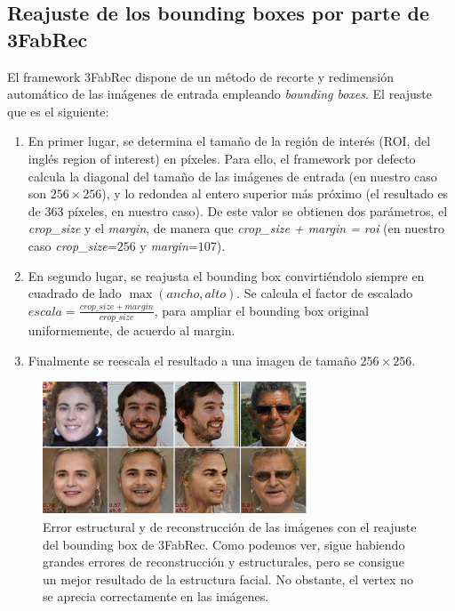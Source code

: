         \subsection{Reajuste de los bounding boxes por parte de 3FabRec}
            \noindent El framework 3FabRec dispone de un método de recorte y redimensión automático de las imágenes de entrada empleando \textit{bounding boxes}. El reajuste que es el siguiente:
            \begin{enumerate}
                \item En primer lugar, se determina el tamaño de la región de interés (ROI, del inglés region of interest) en píxeles. Para ello, el framework por defecto calcula la diagonal del tamaño de las imágenes de entrada (en nuestro caso son $256 \times 256$), y lo redondea al entero superior más próximo (el resultado es de $363$ píxeles, en nuestro caso). De este valor se obtienen dos parámetros, el \textit{crop\_size} y el \textit{margin}, de manera que \textit{crop\_size + margin = roi} (en nuestro caso \textit{crop\_size}=$256$ y \textit{margin}=$107$).
                \item En segundo lugar, se reajusta el bounding box convirtiéndolo siempre en cuadrado de lado $\max(ancho,alto)$. Se calcula el factor de escalado $escala = \frac{crop\_size + margin}{crop\_size}$, para ampliar el bounding box original uniformemente, de acuerdo al margin. 
                \item  Finalmente se reescala el resultado a una imagen de tamaño $256\times 256$.
            \end{enumerate}

            \begin{figure}[!h]
                \centering
                \includegraphics[width=0.7\textwidth]{img/bounding_box_3fabrec.png}
                \caption{Error estructural y de reconstrucción de las imágenes con el reajuste del bounding box de 3FabRec. Como podemos ver, sigue habiendo grandes errores de reconstrucción y estructurales, pero se consigue un mejor resultado de la estructura facial. No obstante, el vertex no se aprecia correctamente en las imágenes.}
                \label{fig:bb_3fabrec}
            \end{figure}

